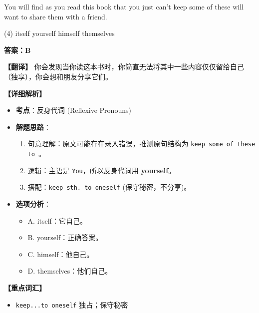 \documentclass[11pt, a4paper]{article}
\newcommand{\analysis}[4]{
    \begin{solutionbox}
        \textbf{答案：#1}
        
        \textbf{【翻译】} #2
        
        \textbf{【详细解析】}
        #3
        
        \textbf{【重点词汇】}
        #4
    \end{solutionbox}
}
\newcommand{\blank}{\underline{\hspace{1.5cm}}}
\begin{document}
\begin{questions}
    \item You will find as you read this book that you just can't keep some of these will \blank want to share them with a friend.
    \begin{tasks}(4)
        \task itself \task yourself \task himself \task themselves
    \end{tasks}
    \analysis{B}{你会发现当你读这本书时，你简直无法将其中一些内容仅仅留给自己（独享），你会想和朋友分享它们。}{
        \begin{itemize}
            \item \textbf{考点}：反身代词 (Reflexive Pronouns)
            \item \textbf{解题思路}：
                \begin{enumerate}
                    \item 句意理解：原文可能存在录入错误，推测原句结构为 \texttt{keep some of these to \blank}。
                    \item 逻辑：主语是 \texttt{You}，所以反身代词用 \textbf{yourself}。
                    \item 搭配：\texttt{keep sth. to oneself} (保守秘密，不分享)。
                \end{enumerate}
            \item \textbf{选项分析}：
                \begin{itemize}
                    \item A. itself：它自己。
                    \item B. yourself：正确答案。
                    \item C. himself：他自己。
                    \item D. themselves：他们自己。
                \end{itemize}
        \end{itemize}
    }{
        \begin{itemize}
            \item \texttt{keep...to oneself} 独占；保守秘密
        \end{itemize}
    }


\end{questions}
\end{document}
